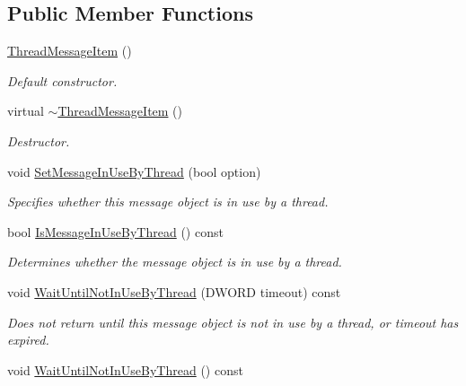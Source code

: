 \subsection*{Public Member Functions}
\begin{DoxyCompactItemize}
\item 
\hyperlink{class_thread_message_item_a0dbc83765bcc4879ed400495ff075cba}{ThreadMessageItem} ()
\begin{DoxyCompactList}\small\item\em Default constructor. \item\end{DoxyCompactList}\item 
virtual \hyperlink{class_thread_message_item_ad4b29c737018a58d94df07ff4d145852}{$\sim$ThreadMessageItem} ()
\begin{DoxyCompactList}\small\item\em Destructor. \item\end{DoxyCompactList}\item 
void \hyperlink{class_thread_message_item_ad630f0afd5fe2d027415d04f35375f33}{SetMessageInUseByThread} (bool option)
\begin{DoxyCompactList}\small\item\em Specifies whether this message object is in use by a thread. \item\end{DoxyCompactList}\item 
bool \hyperlink{class_thread_message_item_a610fc0b5d136db7232b094969f1425bf}{IsMessageInUseByThread} () const 
\begin{DoxyCompactList}\small\item\em Determines whether the message object is in use by a thread. \item\end{DoxyCompactList}\item 
void \hyperlink{class_thread_message_item_a7e837827ca1935946f536c65d73b56a0}{WaitUntilNotInUseByThread} (DWORD timeout) const 
\begin{DoxyCompactList}\small\item\em Does not return until this message object is not in use by a thread, or timeout has expired. \item\end{DoxyCompactList}\item 
\hypertarget{class_thread_message_item_ac29b7d0e5fdd4e53bfbc00da7e2461a2}{
void \hyperlink{class_thread_message_item_ac29b7d0e5fdd4e53bfbc00da7e2461a2}{WaitUntilNotInUseByThread} () const }
\label{class_thread_message_item_ac29b7d0e5fdd4e53bfbc00da7e2461a2}


\end{DoxyCompactItemize}
